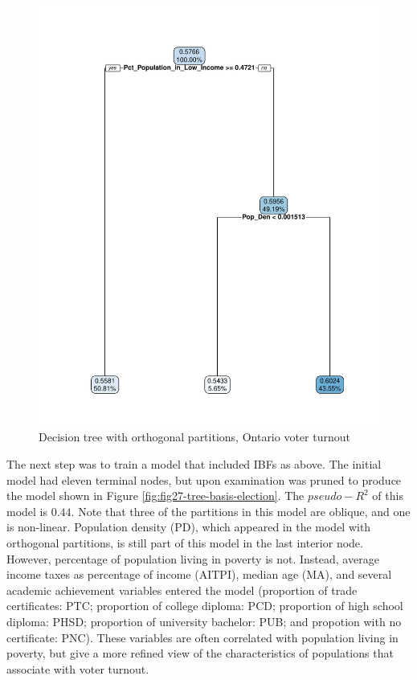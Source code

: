 \documentclass[]{elsarticle} %
\makeatletter
\def\maxwidth{\ifdim\Gin@nat@width>\linewidth\linewidth
\else\Gin@nat@width\fi}
\let\Oldincludegraphics\includegraphics
\renewcommand{\includegraphics}[1]{\Oldincludegraphics[width=\maxwidth]{#1}}
\makeatother
\begin{document}
\begin{figure}
\centering
\includegraphics{Trees_with_Base_Functions_v3_files/figure-latex/fig26-tree-orthogonal-election-1.pdf}
\caption{\label{fig:fig26-tree-orthogonal-election}Decision tree with
orthogonal partitions, Ontario voter turnout}
\end{figure}

The next step was to train a model that included IBFs as above. The
initial model had eleven terminal nodes, but upon examination was pruned
to produce the model shown in Figure
\ref{fig:fig27-tree-basis-election}. The \(pseudo-R^2\) of this model is
\(0.44\). Note that three of the partitions in this model are oblique,
and one is non-linear. Population density (PD), which appeared in the
model with orthogonal partitions, is still part of this model in the
last interior node. However, percentage of population living in poverty
is not. Instead, average income taxes as percentage of income (AITPI),
median age (MA), and several academic achievement variables entered the
model (proportion of trade certificates: PTC; proportion of college
diploma: PCD; proportion of high school diploma: PHSD; proportion of
university bachelor: PUB; and propotion with no certificate: PNC). These
variables are often correlated with population living in poverty, but
give a more refined view of the characteristics of populations that
associate with voter turnout.
\end{document}
